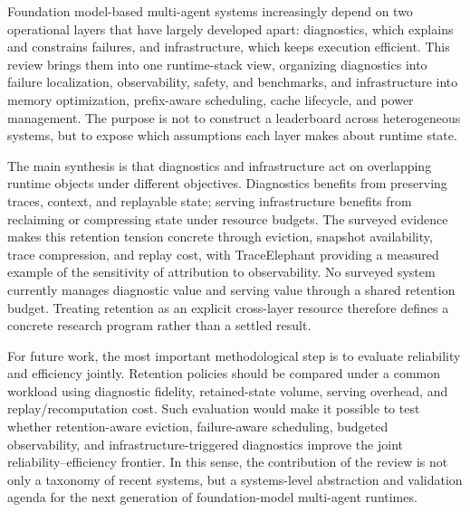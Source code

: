 Foundation model-based multi-agent systems increasingly depend on two operational layers that have largely developed apart: diagnostics, which explains and constrains failures, and infrastructure, which keeps execution efficient. This review brings them into one runtime-stack view, organizing diagnostics into failure localization, observability, safety, and benchmarks, and infrastructure into memory optimization, prefix-aware scheduling, cache lifecycle, and power management. The purpose is not to construct a leaderboard across heterogeneous systems, but to expose which assumptions each layer makes about runtime state.

The main synthesis is that diagnostics and infrastructure act on overlapping runtime objects under different objectives. Diagnostics benefits from preserving traces, context, and replayable state; serving infrastructure benefits from reclaiming or compressing state under resource budgets. The surveyed evidence makes this retention tension concrete through eviction, snapshot availability, trace compression, and replay cost, with TraceElephant providing a measured example of the sensitivity of attribution to observability. No surveyed system currently manages diagnostic value and serving value through a shared retention budget. Treating retention as an explicit cross-layer resource therefore defines a concrete research program rather than a settled result.

For future work, the most important methodological step is to evaluate reliability and efficiency jointly. Retention policies should be compared under a common workload using diagnostic fidelity, retained-state volume, serving overhead, and replay/recomputation cost. Such evaluation would make it possible to test whether retention-aware eviction, failure-aware scheduling, budgeted observability, and infrastructure-triggered diagnostics improve the joint reliability--efficiency frontier. In this sense, the contribution of the review is not only a taxonomy of recent systems, but a systems-level abstraction and validation agenda for the next generation of foundation-model multi-agent runtimes.
